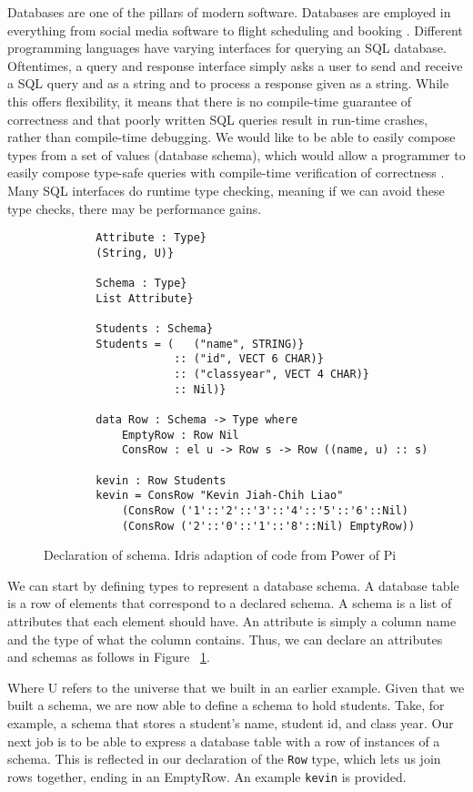 Databases are one of the pillars of modern software. Databases are employed in
everything from social media software \cite{tao} to flight scheduling and
booking \cite{flights}. Different programming languages have varying interfaces
for querying an SQL database. Oftentimes, a query and response interface simply
asks a user to send and receive a SQL query and as a string and to process a
response given as a string. While this offers flexibility, it means that there
is no compile-time guarantee of correctness and that poorly written SQL queries
result in run-time crashes, rather than compile-time debugging. We would like to
be able to easily compose types from a set of values (database schema), which
would allow a programmer to easily compose type-safe queries with compile-time
verification of correctness \cite{power_of_pi}. Many SQL interfaces do runtime
type checking, meaning if we can avoid these type checks, there may be
performance gains. 

\begin{figure}[h]
    \caption{Declaration of schema. Idris adaption of code from Power of Pi \protect\cite{power_of_pi}}
    \label{schema}
    \begin{lstlisting}
        Attribute : Type}
        (String, U)}

        Schema : Type}
        List Attribute}

        Students : Schema}
        Students = (   ("name", STRING)}
                    :: ("id", VECT 6 CHAR)} 
                    :: ("classyear", VECT 4 CHAR)}
                    :: Nil)}

        data Row : Schema -> Type where
            EmptyRow : Row Nil
            ConsRow : el u -> Row s -> Row ((name, u) :: s)

        kevin : Row Students
        kevin = ConsRow "Kevin Jiah-Chih Liao"
            (ConsRow ('1'::'2'::'3'::'4'::'5'::'6'::Nil)
            (ConsRow ('2'::'0'::'1'::'8'::Nil) EmptyRow))
    \end{lstlisting}
\end{figure}

We can start by defining types to represent a database schema. A database table
is a row of elements that correspond to a declared schema. A schema is a list of
attributes that each element should have. An attribute is simply a column name
and the type of what the column contains. Thus, we can declare an attributes and
schemas as follows in Figure ~\ref{schema}. 


Where U refers to the universe that we built in an earlier example. Given that
we built a schema, we are now able to define a schema to hold students. Take,
for example, a schema that stores a student's name, student id, and class year.
Our next job is to be able to express a database table with a row of instances
of a schema. This is reflected in our declaration of the \texttt{Row} type,
which lets us join rows together, ending in an EmptyRow. An example
\texttt{kevin} is provided. 

